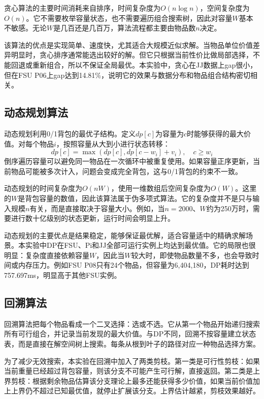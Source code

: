\documentclass[10.5pt,a4paper,fontset=none]{ctexart}
\begin{document}
贪心算法的主要时间消耗来自排序，时间复杂度为$O(n\log n)$，空间复杂度为$O(n)$。它不需要枚举容量状态，也不需要遍历组合搜索树，因此对容量$W$基本不敏感。无论$W$是几百还是几百万，算法流程都主要由物品数$n$决定。

该算法的优点是实现简单、速度快，尤其适合大规模近似求解。当物品单位价值差异明显时，贪心排序通常能选出较好的解。但它只根据当前性价比做局部选择，不能回退或重新组合，所以不保证全局最优。本实验中，贪心在JJ数据上gap很小，但在FSU P06上gap达到14.81\%，说明它的效果与数据分布和物品组合结构密切相关。

\subsection{动态规划算法}

动态规划利用0/1背包的最优子结构。定义$dp[c]$为容量为$c$时能够获得的最大价值。对每个物品$i$，按照容量从大到小进行状态转移：
\begin{equation}
dp[c] = \max(dp[c], dp[c-w_i]+v_i), \quad c \geq w_i
\end{equation}
倒序遍历容量可以避免同一物品在一次循环中被重复使用。如果容量正序更新，当前物品可能被多次计入，问题会变成完全背包，这与0/1背包的约束不一致。

动态规划的时间复杂度为$O(nW)$，使用一维数组后空间复杂度为$O(W)$。这里的$W$是背包容量的数值，因此该算法属于伪多项式算法。它的复杂度并不是只与输入规模$n$有关，而是直接取决于容量大小。例如，当$n=2000$、$W$约为250万时，需要进行数十亿级别的状态更新，运行时间会明显上升。

动态规划的主要优点是结果稳定，能够保证最优解，适合容量适中的精确求解场景。本实验中DP在FSU、Pi和JJ全部可运行实例上均达到最优值。它的局限也很明显：复杂度直接依赖容量$W$，因此当$W$较大时，即使物品数量不多，也会导致时间或内存压力。例如FSU P08只有24个物品，但容量为6,404,180，DP耗时达到757.697ms，明显高于其他FSU实例。

\subsection{回溯算法}

回溯算法把每个物品看成一个二叉选择：选或不选。它从第一个物品开始递归搜索所有可行组合，并记录当前发现的最大价值。与DP不同，回溯不按容量建立状态表，而是直接在解空间树上搜索。每条从根到叶子的路径对应一种物品选择方案。

为了减少无效搜索，本实验在回溯中加入了两类剪枝。第一类是可行性剪枝：如果当前重量已经超过背包容量，则该分支不可能产生可行解，直接返回。第二类是上界剪枝：根据剩余物品估算该分支理论上最多还能获得多少价值，如果当前价值加上上界仍不超过已知最优值，就停止扩展该分支。上界估计越紧，剪枝效果越好。
\end{document}
